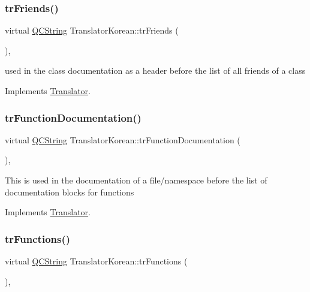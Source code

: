 \subsubsection{\texorpdfstring{trFriends()}{trFriends()}}
{\footnotesize\ttfamily virtual \mbox{\hyperlink{class_q_c_string}{Q\+C\+String}} Translator\+Korean\+::tr\+Friends (\begin{DoxyParamCaption}{ }\end{DoxyParamCaption})\hspace{0.3cm}{\ttfamily [inline]}, {\ttfamily [virtual]}}

used in the class documentation as a header before the list of all friends of a class 

Implements \mbox{\hyperlink{class_translator}{Translator}}.

\mbox{\label{class_translator_korean_aac8f224e390e14875e16f8521370a549}} 
\subsubsection{\texorpdfstring{trFunctionDocumentation()}{trFunctionDocumentation()}}
{\footnotesize\ttfamily virtual \mbox{\hyperlink{class_q_c_string}{Q\+C\+String}} Translator\+Korean\+::tr\+Function\+Documentation (\begin{DoxyParamCaption}{ }\end{DoxyParamCaption})\hspace{0.3cm}{\ttfamily [inline]}, {\ttfamily [virtual]}}

This is used in the documentation of a file/namespace before the list of documentation blocks for functions 

Implements \mbox{\hyperlink{class_translator}{Translator}}.

\mbox{\label{class_translator_korean_ab144346dcb0d01e77740432b3715077d}} 
\subsubsection{\texorpdfstring{trFunctions()}{trFunctions()}}
{\footnotesize\ttfamily virtual \mbox{\hyperlink{class_q_c_string}{Q\+C\+String}} Translator\+Korean\+::tr\+Functions (\begin{DoxyParamCaption}{ }\end{DoxyParamCaption})\hspace{0.3cm}{\ttfamily [inline]}, {\ttfamily [virtual]}}

